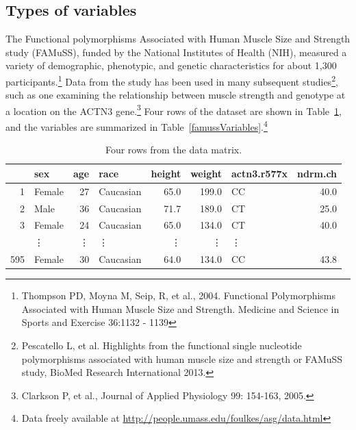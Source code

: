 \begin{doublespace}


\subsection{Types of variables}
\label{variableTypes}


The Functional polymorphisms Associated with Human Muscle Size and Strength study (FAMuSS), funded by the National Institutes of Health (NIH), measured a variety of demographic, phenotypic, and genetic characteristics for about 1,300 participants.\footnote{Thompson PD, Moyna M, Seip, R, et al., 2004.  Functional Polymorphisms Associated with Human Muscle Size and Strength.  Medicine and Science in Sports and Exercise 36:1132 - 1139} Data from the study has been used in many subsequent studies\footnote{Pescatello L, et al. Highlights from the functional single nucleotide polymorphisms associated with human muscle size and strength or FAMuSS study, BioMed Research International 2013.}, such as one examining the relationship between muscle strength and genotype at a location on the ACTN3 gene.\footnote{Clarkson P, et al., Journal of Applied Physiology 99: 154-163, 2005.} Four rows of the  dataset are shown in Table~\ref{famussDF}, and the variables are summarized in Table~\ref{famussVariables}.\footnote{Data freely available at \url{http://people.umass.edu/foulkes/asg/data.html}}

\begin{table}[ht]
	\centering
	\begin{tabular}{rlrlrrlr}
		\hline
		& sex & age & race & height & weight & actn3.r577x & ndrm.ch \\ 
		\hline
		1 & Female & 27 & Caucasian & 65.0 & 199.0 & CC & 40.0 \\ 
		2 & Male & 36 & Caucasian & 71.7 & 189.0 & CT & 25.0 \\ 
		3 & Female & 24 & Caucasian & 65.0 & 134.0 & CT & 40.0 \\ 
       & \vdots & \vdots  & \vdots & \vdots & \vdots & \vdots \\
		595 & Female & 30 & Caucasian & 64.0 & 134.0 & CC & 43.8 \\ 
		\hline
	\end{tabular}
	
	
	\caption{Four rows from the  data matrix.}
	\label{famussDF}
\end{table}


\end{doublespace}
